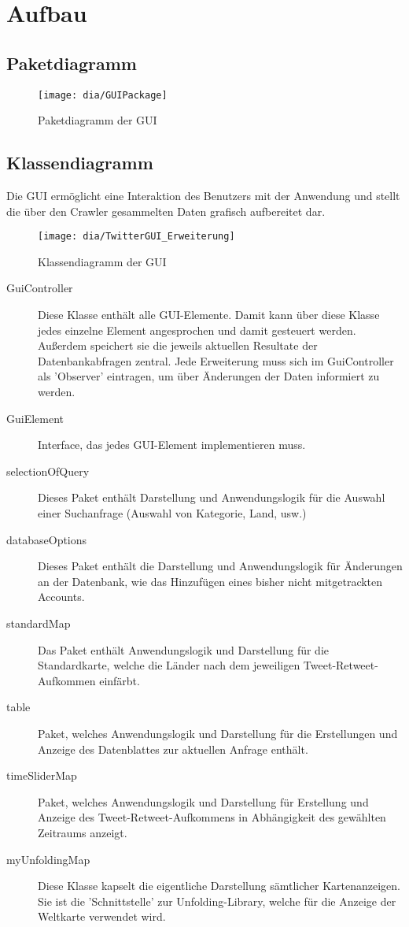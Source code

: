 \section{Aufbau}
\subsection{Paketdiagramm}

\begin{figure}[h!]
	\centering
	\texttt{[image: dia/GUIPackage]}
	\caption{Paketdiagramm der GUI}
	\label{fig:GUI}
\end{figure}

\subsection{Klassendiagramm}
Die GUI ermöglicht eine Interaktion des Benutzers mit der Anwendung und stellt die über den Crawler gesammelten Daten grafisch aufbereitet dar. 
\begin{figure}[h!]
	\centering
	\texttt{[image: dia/TwitterGUI\_Erweiterung]}
	\caption{Klassendiagramm der GUI}
	\label{fig:GUI}
\end{figure}
\begin{description}
	\item[GuiController] Diese Klasse enthält alle GUI-Elemente. Damit kann über diese Klasse jedes einzelne Element angesprochen und damit gesteuert werden. Außerdem speichert sie die jeweils aktuellen Resultate der Datenbankabfragen zentral. Jede Erweiterung muss sich im GuiController als 'Observer' eintragen, um über Änderungen der Daten informiert zu werden. 
	\item[GuiElement] Interface, das jedes GUI-Element implementieren muss.
	\item [selectionOfQuery] Dieses Paket enthält Darstellung und Anwendungslogik für die Auswahl einer Suchanfrage (Auswahl von Kategorie, Land, usw.)
	\item[databaseOptions] Dieses Paket enthält die Darstellung und Anwendungslogik für Änderungen an der Datenbank, wie das Hinzufügen eines bisher nicht mitgetrackten Accounts.
	
	\item [standardMap] Das Paket enthält Anwendungslogik und Darstellung für die Standardkarte, welche die Länder nach dem jeweiligen Tweet-Retweet-Aufkommen einfärbt.
	\item [table] Paket, welches Anwendungslogik und Darstellung für die Erstellungen und Anzeige des Datenblattes zur aktuellen Anfrage enthält.
	\item [timeSliderMap] Paket, welches Anwendungslogik und Darstellung für Erstellung und Anzeige des Tweet-Retweet-Aufkommens in Abhängigkeit des gewählten Zeitraums anzeigt.
	\item [myUnfoldingMap] Diese Klasse kapselt die eigentliche Darstellung sämtlicher Kartenanzeigen. Sie ist die 'Schnittstelle' zur Unfolding-Library, welche für die Anzeige der Weltkarte verwendet wird.
\end{description}

